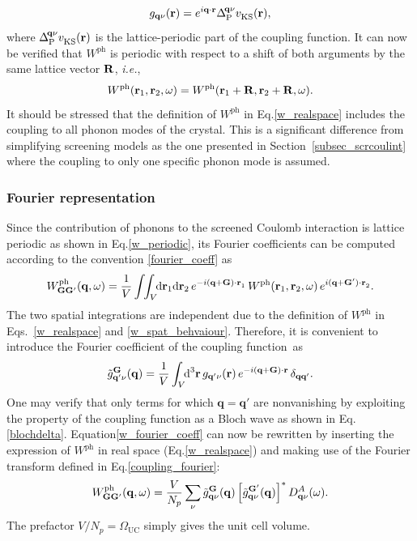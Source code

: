 %
\begin{equation}\label{blochcoupl}
     g_{\mathbf{q}\nu}(\mathbf{r}) = e^{i\mathbf{q\cdot r}}\Delta_\text{P}^{\!\mathbf{q}\nu}v      ^{\phantom{I}}_\text{KS}(\mathbf{r}),
\end{equation}
%
where $\Delta_\text{P}^{\!\mathbf{q}\nu}v^{\phantom{I}}_\text{KS}(\mathbf{r})$ is the lattice-periodic part of the coupling function\cite{Giustino}. It can now be verified that  $W^\text{ph}$ is periodic with respect to a shift of both arguments by the same lattice vector $\mathbf{R}$, \textit{i.e.},
%
\begin{equation}\label{w_periodic}
     W^\text{ph}(\mathbf{r}_1,\mathbf{r}_2,\omega) = W^\text{ph}(\mathbf{r}_1 + \mathbf{R},\mathbf{r}_2 + \mathbf{R},\omega).
\end{equation}
%
It should be stressed that the definition of $W^\text{ph}$ in Eq.\;\eqref{w_realspace} includes the coupling to all phonon modes of the crystal. This is a significant difference from simplifying screening models as the one presented in Section~\ref{subsec_scrcoulint} where the coupling to only one specific phonon mode is assumed.

\subsubsection{Fourier representation}

 Since the contribution of phonons to the screened Coulomb interaction is lattice periodic as shown in Eq.\;\eqref{w_periodic}, its Fourier coefficients can be computed according to  the convention \eqref{fourier_coeff} as 
%
\begin{equation}\label{w_fourier_coeff}
      W^\text{ph}_\mathbf{GG'}(\mathbf{q},\omega) = \frac{1}{V}\int\!\!\int_V \text{\!\!d}\mathbf{r}_1\text{d}\mathbf{r}_2\,e^{-i\mathbf{(q+G)\cdot r}_1}\,W^\text{ph}(\mathbf{r}_1,\mathbf{r}_2,\omega)\,e^{i\mathbf{(q+G')\cdot r}_2}.
\end{equation}
%
The two spatial integrations are independent due to the definition of $W^\text{ph}$ in Eqs.~\eqref{w_realspace} and \eqref{w_spat_behvaiour}. Therefore, it is convenient to introduce the Fourier coefficient of the coupling function~as 
%
\begin{align}\label{coupling_fourier}
     \Tilde{g}_{\mathbf{q'}\nu}^{\mathbf{G}}(\mathbf{q}) = \frac{1}{V} \int_V \text{\!\!d}^3\mathbf{r}\, g_{\mathbf{q'}\nu}(\mathbf{r})\,e^{-i(\mathbf{q}+\mathbf{G})\cdot\mathbf{r}}\,\delta_\mathbf{qq'}.
\end{align}
%
 One may verify that only terms for which $\mathbf{q=q'}$ are nonvanishing by exploiting the property of the coupling function as a Bloch wave as shown in  Eq.\;\eqref{blochdelta}.
Equation\;\eqref{w_fourier_coeff} can now be rewritten by inserting the  expression of $W^\text{ph}$ in real space (Eq.\;\eqref{w_realspace}) and making use of the Fourier transform defined in Eq.\;\eqref{coupling_fourier}:
%
\begin{align}\label{w_fourier_coeff3}
   W^\text{ph}_{\mathbf{G}\mathbf{G}'}(\mathbf{q},\omega) = \frac{V}{N_p}\sum_{\nu} \Tilde{g}_{\mathbf{q}\nu}^{\mathbf{G}}(\mathbf{q})\left[\Tilde{g}_{\mathbf{q}\nu}^{\mathbf{G}'}(\mathbf{q})\right]^*D^A_{\mathbf{q}\nu}(\omega). 
\end{align}
%
The prefactor $V/N_p=\Omega_\text{UC}$ simply gives the unit cell volume.

